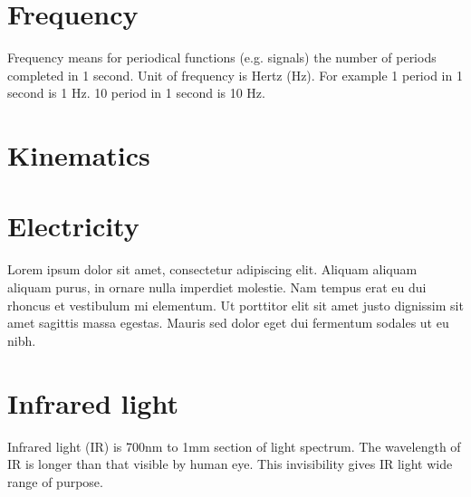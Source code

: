 \documentclass[11pt,a4paper,oneside,article]{memoir}
\begin{document}
\section{Frequency}
Frequency means for periodical functions (e.g. signals) the number of periods completed in 1 second. Unit of frequency is Hertz (Hz). For example 1 period in 1 second is 1 Hz. 10 period in 1 second is 10 Hz.

\section{Kinematics}

\section{Electricity}
Lorem ipsum dolor sit amet, consectetur adipiscing elit. Aliquam aliquam aliquam purus, in ornare nulla imperdiet molestie. Nam tempus erat eu dui rhoncus et vestibulum mi elementum. Ut porttitor elit sit amet justo dignissim sit amet sagittis massa egestas. Mauris sed dolor eget dui fermentum sodales ut eu nibh.

\section{Infrared light}
Infrared light (IR) is 700nm to 1mm section of light spectrum. The wavelength of IR is longer than that visible by human eye. This invisibility gives IR light wide range of purpose.
\end{document}
